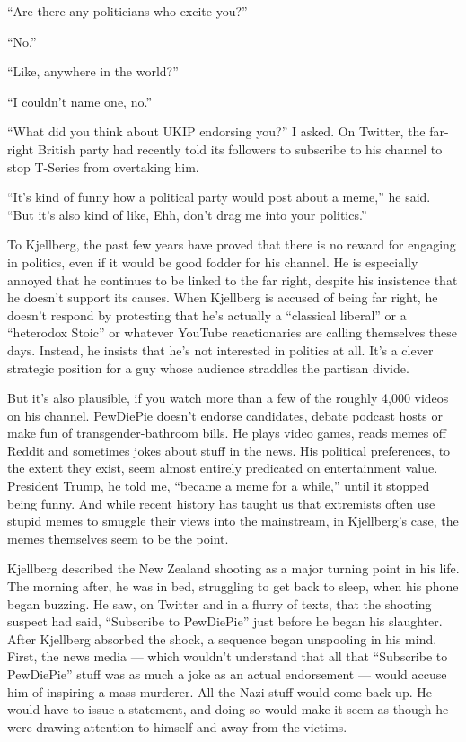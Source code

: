 ``Are there any politicians who excite you?''

``No.''

``Like, anywhere in the world?''

``I couldn't name one, no.''

``What did you think about UKIP endorsing you?'' I asked. On Twitter,
the far-right British party had recently told its followers to subscribe
to his channel to stop T-Series from overtaking him.

``It's kind of funny how a political party would post about a meme,'' he
said. ``But it's also kind of like, Ehh, don't drag me into your
politics.''

To Kjellberg, the past few years have proved that there is no reward for
engaging in politics, even if it would be good fodder for his channel.
He is especially annoyed that he continues to be linked to the far
right, despite his insistence that he doesn't support its causes. When
Kjellberg is accused of being far right, he doesn't respond by
protesting that he's actually a ``classical liberal'' or a ``heterodox
Stoic'' or whatever YouTube reactionaries are calling themselves these
days. Instead, he insists that he's not interested in politics at all.
It's a clever strategic position for a guy whose audience straddles the
partisan divide.

But it's also plausible, if you watch more than a few of the roughly
4,000 videos on his channel. PewDiePie doesn't endorse candidates,
debate podcast hosts or make fun of transgender-bathroom bills. He plays
video games, reads memes off Reddit and sometimes jokes about stuff in
the news. His political preferences, to the extent they exist, seem
almost entirely predicated on entertainment value. President Trump, he
told me, ``became a meme for a while,'' until it stopped being funny.
And while recent history has taught us that extremists often use stupid
memes to smuggle their views into the mainstream, in Kjellberg's case,
the memes themselves seem to be the point.

Kjellberg described the New Zealand shooting as a major turning point in
his life. The morning after, he was in bed, struggling to get back to
sleep, when his phone began buzzing. He saw, on Twitter and in a flurry
of texts, that the shooting suspect had said, ``Subscribe to PewDiePie''
just before he began his slaughter. After Kjellberg absorbed the shock,
a sequence began unspooling in his mind. First, the news media --- which
wouldn't understand that all that ``Subscribe to PewDiePie'' stuff was
as much a joke as an actual endorsement --- would accuse him of
inspiring a mass murderer. All the Nazi stuff would come back up. He
would have to issue a statement, and doing so would make it seem as
though he were drawing attention to himself and away from the victims.

